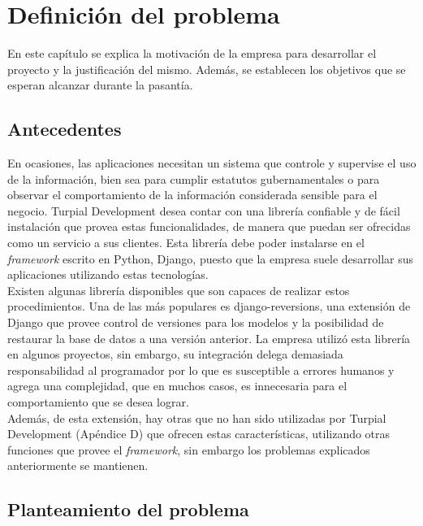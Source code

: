 \chapter{\textbf{Definición del problema}}

\thispagestyle{empty}

En este capítulo se explica la motivación de la empresa para desarrollar el
proyecto y la justificación del mismo. Además, se establecen los objetivos que
se esperan alcanzar durante la pasantía.

\section{Antecedentes}

En ocasiones, las aplicaciones necesitan un sistema que controle y supervise el
uso de la información, bien sea para cumplir estatutos gubernamentales o para
observar el comportamiento de la información considerada sensible para el
negocio. Turpial Development desea contar con una librería confiable y de fácil
instalación que provea estas funcionalidades, de manera que puedan ser
ofrecidas como un servicio a sus clientes. Esta librería debe poder instalarse
en el \textit{framework} escrito en Python, Django, puesto que la empresa suele
desarrollar sus aplicaciones utilizando estas tecnologías. \\

Existen algunas librería disponibles que son capaces de realizar estos
procedimientos. Una de las más populares es django-reversions, una extensión de
Django que provee control de versiones para los modelos y la posibilidad de
restaurar la base de datos a una versión anterior. La empresa utilizó esta
librería en algunos proyectos, sin embargo, su integración delega demasiada
responsabilidad al programador por lo que es susceptible a errores humanos y
agrega una complejidad, que en muchos casos, es innecesaria para el
comportamiento que se desea lograr. \\

Además, de esta extensión, hay otras que no han sido utilizadas por Turpial
Development (Apéndice D) que ofrecen estas características, utilizando otras
funciones que provee el \textit{framework}, sin embargo los problemas explicados
anteriormente se mantienen.

\section{Planteamiento del problema}

